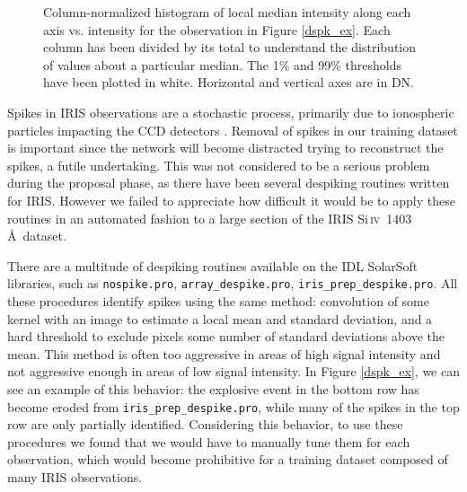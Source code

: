 \documentclass[10pt,letterpaper]{article}
\newcommand{\SiIV}{Si\,\textsc{iv}~1403\,\AA}
\begin{document}
\begin{figure}[h!]
				\caption{Column-normalized histogram of local median intensity along each axis vs. intensity for the observation in Figure \ref{dspk_ex}.
					Each column has been divided by its total to understand the distribution of values about a particular median.
					The 1\% and 99\% thresholds have been plotted in white.
					Horizontal and vertical axes are in DN.}
				
				\label{dspk_hist}
				
			\end{figure}
			
			Spikes in IRIS observations are a stochastic process, primarily due to ionospheric particles impacting the CCD detectors \citep{itn15}.
			Removal of spikes in our training dataset is important since the network will become distracted trying to reconstruct the spikes, a futile undertaking.
			This was not considered to be a serious problem during the proposal phase, as there have been several despiking routines written for IRIS.
			However we failed to appreciate how difficult it would be to apply these routines in an automated fashion to a large section of the IRIS \SiIV\ dataset.
			
			There are a multitude of despiking routines available on the IDL SolarSoft libraries, such as \texttt{nospike.pro}, \texttt{array\_despike.pro}, \texttt{iris\_prep\_despike.pro}.
			All these procedures identify spikes using the same method: convolution of some kernel with an image to estimate a local mean and standard deviation, and a hard threshold to exclude pixels some number of standard deviations above the mean.
			This method is often too aggressive in areas of high signal intensity and not aggressive enough in areas of low signal intensity.
			In Figure \ref{dspk_ex}, we can see an example of this behavior: the explosive event in the bottom row has become eroded from \texttt{iris\_prep\_despike.pro}, while many of the spikes in the top row are only partially identified.
			Considering this behavior, to use these procedures we found that we would have to manually tune them for each observation, which would become prohibitive for a training dataset composed of many IRIS observations.
			
\end{document}
